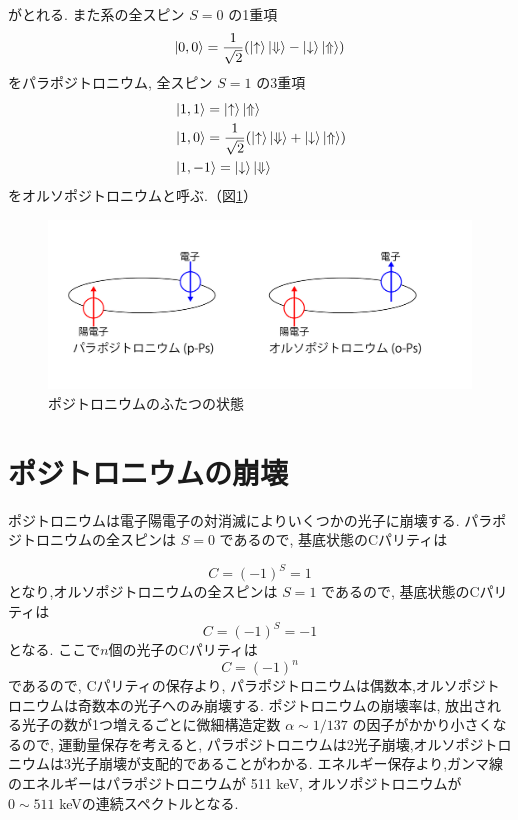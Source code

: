 がとれる.
また系の全スピン $S = 0$ の1重項
\begin{equation}
\ket{0,0} = \frac{1}{\sqrt{2}} ( \ket{ \uparrow } \ket{ \Downarrow } - \ket{ \downarrow } \ket{ \Uparrow })
\label{eq:para}
\end{equation}
をパラポジトロニウム,
全スピン $S = 1$ の3重項
\begin{equation}
\begin{split}
&\ket{1,1} = \ket{ \uparrow } \ket{ \Uparrow } \\
&\ket{1,0} = \frac{1}{\sqrt{2}} ( \ket{ \uparrow } \ket{ \Downarrow } + \ket{ \downarrow } \ket{ \Uparrow }) \\
&\ket{1,-1} = \ket{ \downarrow } \ket{ \Downarrow }
\end{split}
\label{eq:ortho}
\end{equation}
をオルソポジトロニウムと呼ぶ.（図\ref{fig:Ps}）

\begin{figure}[H]
\centering
\includegraphics[keepaspectratio, scale=0.4]{fig/ybm/Ps.pdf}
\caption{ポジトロニウムのふたつの状態}
\label{fig:Ps}
\end{figure}


\section{ポジトロニウムの崩壊}

ポジトロニウムは電子陽電子の対消滅によりいくつかの光子に崩壊する.
パラポジトロニウムの全スピンは $S=0$ であるので,
基底状態のCパリティは

\begin{equation}
	\nonumber
C = (-1)^{S} = 1
\end{equation}
となり,オルソポジトロニウムの全スピンは $S=1$ であるので,
基底状態のCパリティは
\begin{equation}
	\nonumber
C = (-1)^{S} = -1
\end{equation}
となる.
ここで$n$個の光子のCパリティは
\begin{equation}
	\nonumber
C = (-1)^{n}
\end{equation}
であるので,
Cパリティの保存より,
パラポジトロニウムは偶数本,オルソポジトロニウムは奇数本の光子へのみ崩壊する.
ポジトロニウムの崩壊率は,
放出される光子の数が1つ増えるごとに微細構造定数 $\alpha \sim 1/137$ の因子がかかり小さくなるので,
運動量保存を考えると,
パラポジトロニウムは2光子崩壊,オルソポジトロニウムは3光子崩壊が支配的であることがわかる.
エネルギー保存より,ガンマ線のエネルギーはパラポジトロニウムが 511 keV,
オルソポジトロニウムが $0 \sim 511$  keVの連続スペクトルとなる.

